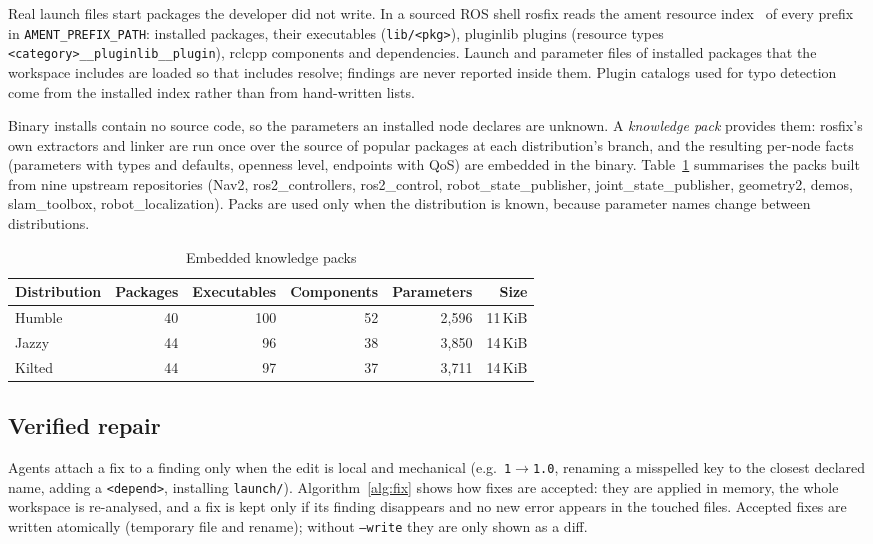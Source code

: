 ﻿\documentclass[conference]{IEEEtran}
\newcommand{\tool}{\textsf{rosfix}}
\newcommand{\code}[1]{\texttt{#1}}
\begin{document}
Real launch files start packages the developer did not write. In a sourced ROS shell \tool{}
reads the ament resource index~\cite{ament_index} of every prefix in \code{AMENT\_PREFIX\_PATH}:
installed packages, their executables (\code{lib/<pkg>}), pluginlib plugins (resource types
\code{<category>\_\_pluginlib\_\_plugin}), rclcpp components and dependencies. Launch and
parameter files of installed packages that the workspace includes are loaded so that includes
resolve; findings are never reported inside them. Plugin catalogs used for typo detection come
from the installed index rather than from hand-written lists.

Binary installs contain no source code, so the parameters an installed node declares are
unknown. A \emph{knowledge pack} provides them: \tool's own extractors and linker are run once
over the source of popular packages at each distribution's branch, and the resulting per-node
facts (parameters with types and defaults, openness level, endpoints with QoS) are embedded in
the binary. Table~\ref{tab:packs} summarises the packs built from nine upstream repositories
(Nav2, ros2\_controllers, ros2\_control, robot\_state\_publisher, joint\_state\_publisher,
geometry2, demos, slam\_toolbox, robot\_localization). Packs are used only when the
distribution is known, because parameter names change between distributions.

\begin{table}[t]
\centering
\caption{Embedded knowledge packs}
\label{tab:packs}
\footnotesize
\begin{tabular}{@{}lrrrrr@{}}
\toprule
Distribution & Packages & Executables & Components & Parameters & Size \\
\midrule
Humble & 40 & 100 & 52 & 2{,}596 & 11\,KiB\\
Jazzy  & 44 &  96 & 38 & 3{,}850 & 14\,KiB\\
Kilted & 44 &  97 & 37 & 3{,}711 & 14\,KiB\\
\bottomrule
\end{tabular}
\end{table}

\subsection{Verified repair}
\label{sec:repair}

Agents attach a fix to a finding only when the edit is local and mechanical (e.g.\
\code{1}$\to$\code{1.0}, renaming a misspelled key to the closest declared name, adding a
\code{<depend>}, installing \code{launch/}). Algorithm~\ref{alg:fix} shows how fixes are
accepted: they are applied in memory, the whole workspace is re-analysed, and a fix is kept only
if its finding disappears and no new error appears in the touched files. Accepted fixes are
written atomically (temporary file and rename); without \code{--write} they are only shown as a
diff.
\end{document}
